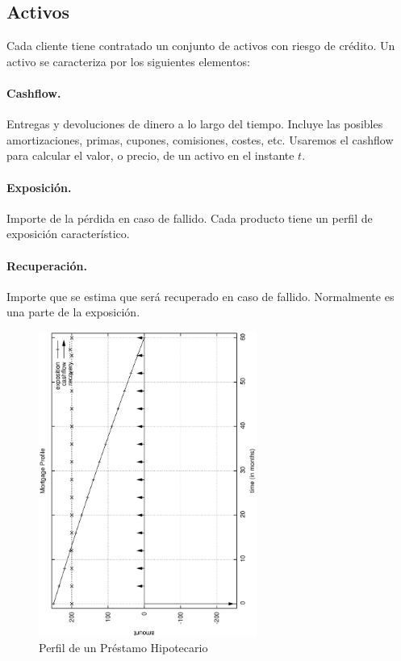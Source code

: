 \subsection{Activos}

Cada cliente tiene contratado un conjunto de activos con riesgo de cr\'edito.
Un activo se caracteriza por los siguientes elementos:

\paragraph{Cashflow.} Entregas y devoluciones de dinero a lo largo del tiempo. 
Incluye las posibles amortizaciones, primas, cupones, comisiones, costes, etc. 
Usaremos el cashflow para calcular el valor, o precio, de un activo en el 
instante $t$.

\paragraph{Exposici\'on.} Importe de la p\'erdida en caso de fallido. Cada 
producto tiene un perfil de exposici\'on caracter\'istico.

\paragraph{Recuperaci\'on.} Importe que se estima que ser\'a recuperado en 
caso de fallido. Normalmente es una parte de la exposici\'on.


\begin{figure}[!hb]
\begin{center}
\includegraphics[height=10cm, angle=-90]{./images/mortgage.ps}
\caption{Perfil de un Pr\'estamo Hipotecario}
\label{mortgage}
\end{center}
\end{figure}


